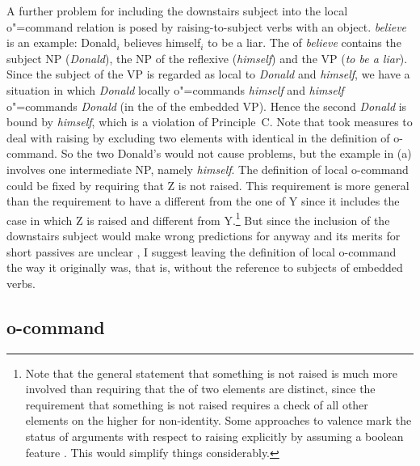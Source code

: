 \documentclass[output=paper
	        ,collection
	        ,collectionchapter
 	        ,biblatex
                ,babelshorthands
                ,newtxmath
                ,draftmode
                ,colorlinks, citecolor=brown
]{langscibook}
\begin{document}
A further problem for including the downstairs subject into the local o"=command relation is posed by
raising-to-subject verbs with an object. \emph{believe} is an example:
\eal
\ex Donald$_i$ believes himself$_i$ to be a liar.
\ex \sliste{ \ibox{1} NP$_i$, NP$_i$, VP[ \subj \sliste{ \ibox{1} } } 
\zl
The \argstl of \emph{believe} contains the subject NP (\emph{Donald}), the NP of the reflexive
(\emph{himself}) and the VP (\emph{to be a liar}). Since the
subject of the VP is regarded as local to \emph{Donald} and \emph{himself}, we have a situation in
which \emph{Donald} locally o"=commands \emph{himself} and \emph{himself} o"=commands
\emph{Donald} (in the \subjl of the embedded VP). Hence the second \emph{Donald} is bound by \emph{himself}, which is a violation of
Principle~C. 
Note that \citet[]{ps2} took measures to deal with raising by excluding two
elements with identical \localvs in the definition of o-command. So the two Donald's would not cause problems, but the example in
(a) involves one intermediate NP, namely \emph{himself}. The definition of local o-command
could be fixed by requiring that Z is not raised. This requirement is more general than the
requirement to have a \localv different from the one of Y since it includes the case in which Z is
raised and different from Y.\footnote{%
  Note that the general statement that something is not raised is much more involved than requiring
  that the \localvs of two elements are distinct, since the requirement that something is not raised
  requires a check of all other elements on the higher \argstl for non-identity. Some approaches to
  valence mark the status of arguments with respect to raising explicitly by assuming a boolean
  feature  \citep{Prze99,Meurers99b}. This would simplify things considerably.%
} But since the inclusion of the downstairs subject would
make wrong predictions for  anyway and its merits for  short passives are unclear
\citep[]{ps2}, I suggest leaving the definition of local o-command the
way it originally was, that is, without the reference to subjects of embedded verbs. 

\subsection{o-command}
\end{document}
